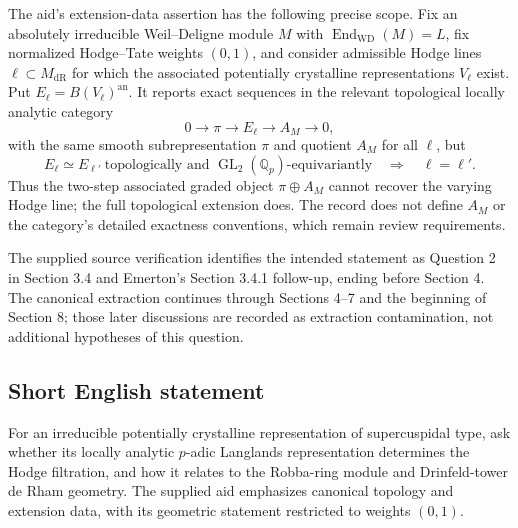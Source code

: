 \documentclass[11pt]{article}
\newcommand{\Q}{\mathbb{Q}}
\begin{document}
The aid's extension-data assertion has the following precise scope. Fix an absolutely irreducible Weil--Deligne module $M$ with $\operatorname{End}_{\mathrm{WD}}(M)=L$, fix normalized Hodge--Tate weights $(0,1)$, and consider admissible Hodge lines $\ell\subset M_{\mathrm{dR}}$ for which the associated potentially crystalline representations $V_\ell$ exist. Put $E_\ell=B(V_\ell)^{\mathrm{an}}$. It reports exact sequences in the relevant topological locally analytic category
\[
0\longrightarrow\pi\longrightarrow E_\ell\longrightarrow A_M\longrightarrow0,
\]
with the same smooth subrepresentation $\pi$ and quotient $A_M$ for all $\ell$, but
\[
E_\ell\simeq E_{\ell'}\ \text{topologically and }\operatorname{GL}_2(\Q_p)\text{-equivariantly}
\quad\Longrightarrow\quad\ell=\ell'.
\]
Thus the two-step associated graded object $\pi\oplus A_M$ cannot recover the varying Hodge line; the full topological extension does. The record does not define $A_M$ or the category's detailed exactness conventions, which remain review requirements.

The supplied source verification identifies the intended statement as Question 2 in Section 3.4 and Emerton's Section 3.4.1 follow-up, ending before Section 4. The canonical extraction continues through Sections 4--7 and the beginning of Section 8; those later discussions are recorded as extraction contamination, not additional hypotheses of this question.
\subsection{Short English statement}
For an irreducible potentially crystalline representation of supercuspidal type, ask whether its locally analytic $p$-adic Langlands representation determines the Hodge filtration, and how it relates to the Robba-ring module and Drinfeld-tower de Rham geometry. The supplied aid emphasizes canonical topology and extension data, with its geometric statement restricted to weights $(0,1)$.
\end{document}
